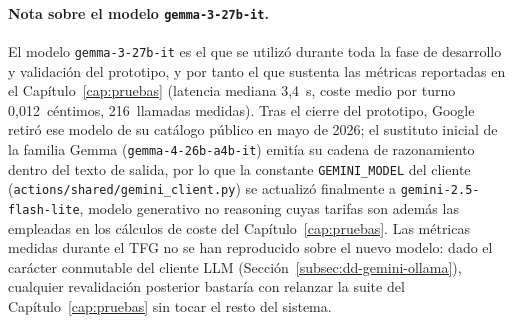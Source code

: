 \paragraph{Nota sobre el modelo \texttt{gemma-3-27b-it}.} El modelo \texttt{gemma-3-27b-it} es el que se utilizó durante toda la fase de desarrollo y validación del prototipo, y por tanto el que sustenta las métricas reportadas en el Capítulo~\ref{cap:pruebas} (latencia mediana 3,4~s, coste medio por turno 0,012~céntimos, 216~llamadas medidas). Tras el cierre del prototipo, Google retiró ese modelo de su catálogo público en mayo de 2026; el sustituto inicial de la familia Gemma (\texttt{gemma-4-26b-a4b-it}) emitía su cadena de razonamiento dentro del texto de salida, por lo que la constante \texttt{GEMINI\_MODEL} del cliente (\texttt{actions/shared/gemini\_client.py}) se actualizó finalmente a \texttt{gemini-2.5-flash-lite}, modelo generativo no reasoning cuyas tarifas son además las empleadas en los cálculos de coste del Capítulo~\ref{cap:pruebas}. Las métricas medidas durante el TFG no se han reproducido sobre el nuevo modelo: dado el carácter conmutable del cliente LLM (Sección~\ref{subsec:dd-gemini-ollama}), cualquier revalidación posterior bastaría con relanzar la suite del Capítulo~\ref{cap:pruebas} sin tocar el resto del sistema.
